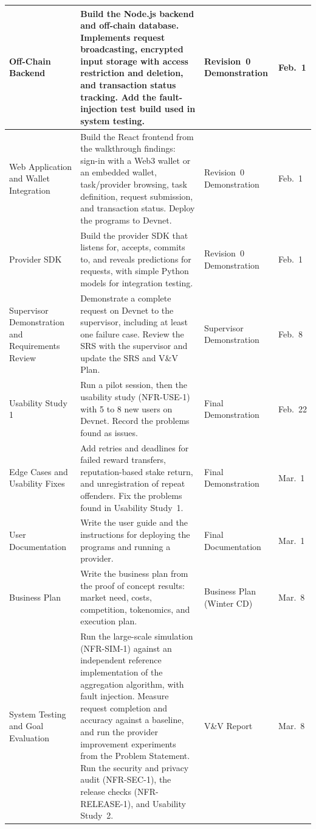 \documentclass[12pt]{article}
\begin{document}
\begin{longtable}{|p{}|p{}|p{}|p{}|}
\hline
Off-Chain Backend & Build the Node.js backend and off-chain database. Implements request broadcasting, encrypted input storage with access restriction and deletion, and transaction status tracking. Add the fault-injection test build used in system testing. & Revision~0 Demonstration & Feb.~1 \\
\hline
Web Application and Wallet Integration & Build the React frontend from the walkthrough findings: sign-in with a Web3 wallet or an embedded wallet, task/provider browsing, task definition, request submission, and transaction status. Deploy the programs to Devnet. & Revision~0 Demonstration & Feb.~1 \\
\hline
Provider SDK & Build the provider SDK that listens for, accepts, commits to, and reveals predictions for requests, with simple Python models for integration testing. & Revision~0 Demonstration & Feb.~1 \\
\hline
Supervisor Demonstration and Requirements Review & Demonstrate a complete request on Devnet to the supervisor, including at least one failure case. Review the SRS with the supervisor and update the SRS and V\&V Plan. & Supervisor Demonstration & Feb.~8 \\
\hline
Usability Study 1 & Run a pilot session, then the usability study (NFR-USE-1) with 5 to 8 new users on Devnet. Record the problems found as issues. & Final Demonstration & Feb.~22 \\
\hline
Edge Cases and Usability Fixes & Add retries and deadlines for failed reward transfers, reputation-based stake return, and unregistration of repeat offenders. Fix the problems found in Usability Study~1. & Final Demonstration & Mar.~1 \\
\hline
User Documentation & Write the user guide and the instructions for deploying the programs and running a provider. & Final Documentation & Mar.~1 \\
\hline
Business Plan & Write the business plan from the proof of concept results: market need, costs, competition, tokenomics, and execution plan. & Business Plan (Winter CD) & Mar.~8 \\
\hline
System Testing and Goal Evaluation & Run the large-scale simulation (NFR-SIM-1) against an independent reference implementation of the aggregation algorithm, with fault injection. Measure request completion and accuracy against a baseline, and run the provider improvement experiments from the Problem Statement. Run the security and privacy audit (NFR-SEC-1), the release checks (NFR-RELEASE-1), and Usability Study~2. & V\&V Report & Mar.~8 \\

\end{longtable}
\end{document}

